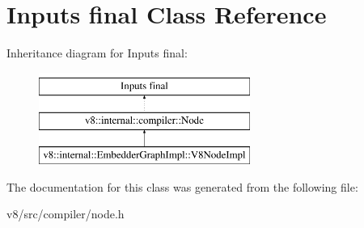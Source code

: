 \hypertarget{classInputs_01final}{}\section{Inputs final Class Reference}
\label{classInputs_01final}
Inheritance diagram for Inputs final\+:\begin{figure}[H]
\begin{center}
\leavevmode
\includegraphics[height=3.000000cm]{classInputs_01final}
\end{center}
\end{figure}


The documentation for this class was generated from the following file\+:\begin{DoxyCompactItemize}
\item 
v8/src/compiler/node.\+h\end{DoxyCompactItemize}
